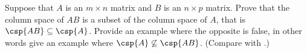 Suppose that $A$ is an $m\times n$ matrix and $B$ is an $n\times p$ matrix.  Prove that the column space of $AB$ is a subset of the column space of $A$, that is $\csp{AB}\subseteq\csp{A}$.  Provide an example where the opposite is false, in other words give an example where $\csp{A}\not\subseteq\csp{AB}$.   (Compare with .)